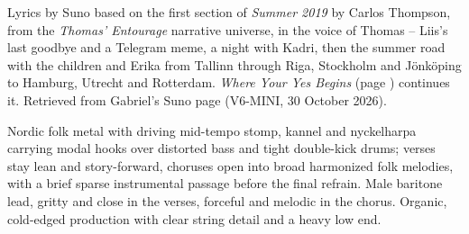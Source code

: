 
\label{sec:roads-run-north}
\begin{notes}
Lyrics by Suno based on the first section of \emph{Summer 2019} by Carlos Thompson, from the \emph{Thomas' Entourage} narrative universe, in the voice of Thomas -- Liis's last goodbye and a Telegram meme, a night with Kadri, then the summer road with the children and Erika from Tallinn through Riga, Stockholm and Jönköping to Hamburg, Utrecht and Rotterdam. \emph{Where Your Yes Begins} (page \pageref{sec:where-your-yes-begins}) continues it. Retrieved from Gabriel's Suno page (V6-MINI, 30 October 2026).
\end{notes}
\begin{style}
Nordic folk metal with driving mid-tempo stomp, kannel and nyckelharpa carrying modal hooks over distorted bass and tight double-kick drums; verses stay lean and story-forward, choruses open into broad harmonized folk melodies, with a brief sparse instrumental passage before the final refrain. Male baritone lead, gritty and close in the verses, forceful and melodic in the chorus. Organic, cold-edged production with clear string detail and a heavy low end.
\end{style}
